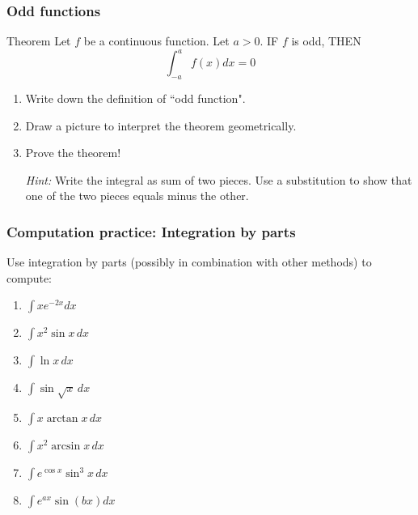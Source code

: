 \begin{frame}[t]
	\fontsize{13}{13}\selectfont
	\frametitle{Odd functions}

	\begin{block}{Theorem}
		Let $f$ be a continuous function. Let $a >0$. IF $f$ is odd, THEN
		\[
			\int_{-a}^{a}f(x) dx = 0
		\]
	\end{block}


	\begin{enumerate}
		\item Write down the definition of ``odd function".

		\item Draw a picture to interpret the theorem geometrically.

		\item Prove the theorem!

			\emph{Hint:} Write the integral as sum of two pieces. Use a substitution to
			show that one of the two pieces equals minus the other.
	\end{enumerate}
\end{frame}

\begin{frame}[t]
	\frametitle{Computation practice: Integration by parts}

	Use integration by parts (possibly in combination with other methods) to
	compute:
	\begin{multicols}{2}
		\begin{enumerate}
			\item $\displaystyle \int x e^{-2x}dx$
				\vspace{.2cm}

			\item $\displaystyle \int x^{2}\sin x \, dx$
				\vspace{.2cm}

			\item $\displaystyle \int \ln x \, dx$
				\vspace{.2cm}

			\item $\displaystyle \int \sin \sqrt{x}\, dx$
				\vspace{.2cm}

			\item $\displaystyle \int x \arctan x \, dx$
				\vspace{.2cm}

			\item $\displaystyle \int x^{2}\arcsin x \, dx$
				\vspace{.2cm}

			\item $\displaystyle \int e^{\cos x}\sin^{3}x \, dx$
				\vspace{.2cm}

			\item $\displaystyle \int e^{ax}\sin (bx) dx$
				\vspace{.2cm}
		\end{enumerate}
	\end{multicols}
\end{frame}

